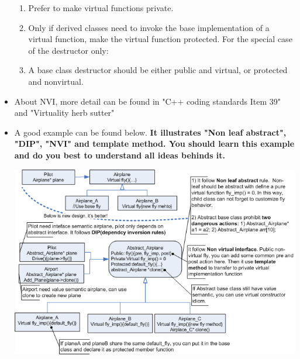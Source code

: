 \documentclass[a4paper,11pt,twoside]{book}
\begin{document}
\begin{itemize}
\begin{enumerate}
	\item Prefer to make virtual functions private.
	
	\item Only if derived classes need to invoke the base implementation of a virtual function, make the virtual function protected. For the special case of the destructor only:
	
	\item A base class destructor should be either public and virtual, or protected and nonvirtual.
\end{enumerate}

    \item About NVI, more detail can be found in "C++ coding standards Item 39" and "Virtuality herb sutter"

    \item A good example can be found below. \textbf{It illustrates "Non leaf abstract", "DIP", "NVI" and template method. You should learn this example and do you best to understand all ideas behinds it. }

	\centering
	\includegraphics[width=0.93\linewidth]{pics/NVI.png}


\end{itemize}
\end{document}
